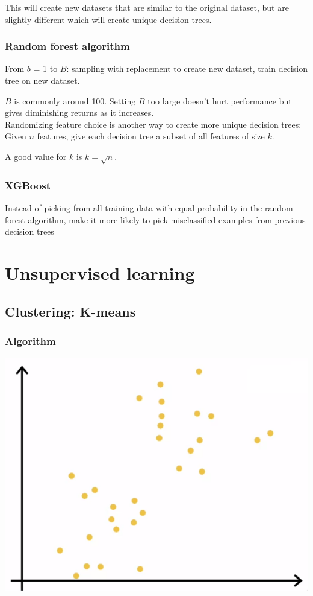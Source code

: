 \documentclass[12pt]{article}
\begin{document}
This will create new datasets that are similar to the original dataset, but are slightly different
which will create unique decision trees.

\subsubsection{Random forest algorithm}

From $b$ = 1 to $B$: sampling with replacement to create new dataset, train decision tree on new dataset.

$B$ is commonly around 100. Setting $B$ too large doesn't hurt performance but gives diminishing returns
as it increases.\\

Randomizing feature choice is another way to create more unique decision trees:
Given $n$ features, give each decision tree a subset of all features of size $k$.

A good value for $k$ is $k = \sqrt n$.

\subsubsection{XGBoost}

Instead of picking from all training data with equal probability in the random forest algorithm,
make it more likely to pick misclassified examples from previous decision trees

\section{Unsupervised learning}

\subsection{Clustering: K-means}

\subsubsection{Algorithm}

\includegraphics[scale=.5]{images/clusters.png}
\end{document}
